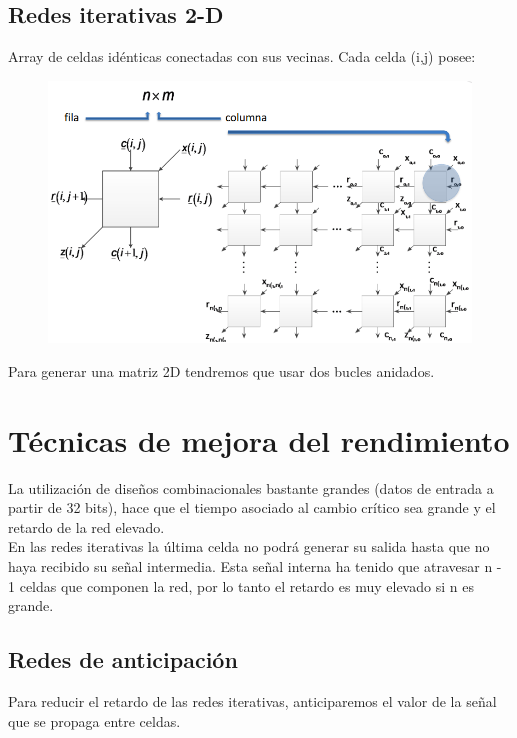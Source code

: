 \subsection{Redes iterativas 2-D}
Array de celdas idénticas conectadas con sus vecinas. Cada celda (i,j) posee:
\begin{figure}[H]
	\centering
	\includegraphics[width=\textwidth]{images/Tema_3/Red_2D.PNG}
\end{figure}

Para generar una matriz 2D tendremos que usar dos bucles anidados.

\section{Técnicas de mejora del rendimiento}
La utilización de diseños combinacionales bastante grandes (datos de entrada a partir de 32 bits), hace que el tiempo asociado al cambio crítico sea grande y el retardo de la red elevado.\\
En las redes iterativas la última celda no podrá generar su salida hasta que no haya recibido su señal intermedia. Esta señal interna ha tenido que atravesar n - 1 celdas que componen la red, por lo tanto el retardo es muy elevado si n es grande.

\subsection{Redes de anticipación}
Para reducir el retardo de las redes iterativas, anticiparemos el valor de la señal que se propaga entre celdas.

